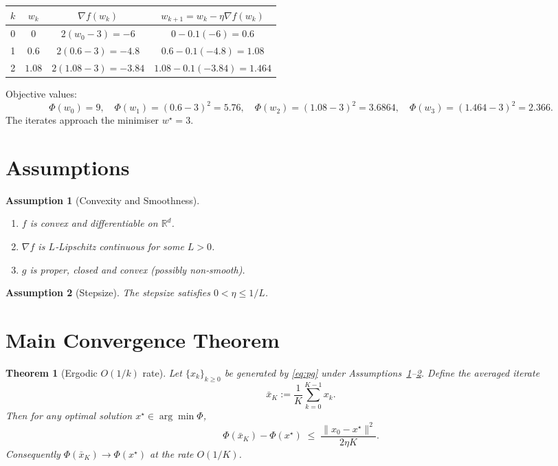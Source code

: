 \documentclass{article}
\newtheorem{theorem}{Theorem}
\newtheorem{assumption}{Assumption}
\newcommand{\R}{\mathbb{R}}
\begin{document}
\begin{center}
\begin{tabular}{c|c|c|c}
$k$ & $w_{k}$ & $\nabla f(w_{k})$ & $w_{k+1}=w_{k}-\eta\nabla f(w_{k})$ \\ \hline
0 & $0$ & $2(w_{0}-3)=-6$ & $0-0.1(-6)=0.6$ \\
1 & $0.6$ & $2(0.6-3)=-4.8$ & $0.6-0.1(-4.8)=1.08$ \\
2 & $1.08$ & $2(1.08-3)=-3.84$ & $1.08-0.1(-3.84)=1.464$ \\
\end{tabular}
\end{center}
Objective values:
\[
\Phi(w_{0})=9,\quad \Phi(w_{1})=(0.6-3)^{2}=5.76,\quad \Phi(w_{2})=(1.08-3)^{2}=3.6864,\quad \Phi(w_{3})=(1.464-3)^{2}=2.366.
\]
The iterates approach the minimiser $w^{\star}=3$.

\newpage
\section*{Assumptions}
\begin{assumption}[Convexity and Smoothness]\label{as:convex}
\begin{enumerate}
\item $f$ is convex and differentiable on $\R^{d}$.
\item $\nabla f$ is $L$‑Lipschitz continuous for some $L>0$.
\item $g$ is proper, closed and convex (possibly non‑smooth).
\end{enumerate}
\end{assumption}
\begin{assumption}[Stepsize]\label{as:stepsize}
The stepsize satisfies $0<\eta\le 1/L$.
\end{assumption}

\section*{Main Convergence Theorem}
\begin{theorem}[Ergodic $O(1/k)$ rate]\label{thm:rate}
Let $\{x_{k}\}_{k\ge0}$ be generated by \eqref{eq:pg} under Assumptions~\ref{as:convex}–\ref{as:stepsize}.  
Define the averaged iterate
\[
\bar{x}_{K}:=\frac{1}{K}\sum_{k=0}^{K-1}x_{k}.
\]
Then for any optimal solution $x^{\star}\in\arg\min\Phi$,
\begin{equation}
\label{eq:rate}
\Phi(\bar{x}_{K})-\Phi(x^{\star})\;\le\;\frac{\|x_{0}-x^{\star}\|^{2}}{2\eta K}.
\end{equation}
Consequently $\Phi(\bar{x}_{K})\to\Phi(x^{\star})$ at the rate $O(1/K)$.
\end{theorem}
\end{document}
